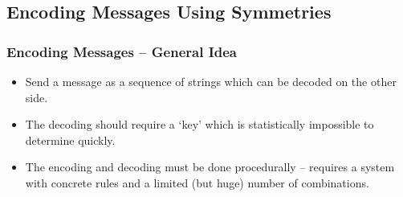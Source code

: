 \documentclass[aspectratio=169,11pt,svgnames,draft]{beamer}
\newcommand{\clc}{\textcolor{PolygonCyan}}
\newcommand{\clb}{\textcolor{PolygonBlue}}
\newcommand{\clo}{\textcolor{PolygonOrange}}
\begin{document}
%  
%

\subsection{Encoding Messages Using Symmetries}
\begin{frame}
 \subsectionpage
\end{frame}

\begin{frame}
 \frametitle{Encoding Messages -- General Idea}
 \begin{itemize}[label=\textbullet]
  \item Send a message as a sequence of strings which \alert{can be decoded on
   the other side}.
  \pause
  \item The decoding should require a `key' which is \alert{statistically
   impossible to determine quickly}.
  \pause
  \item The encoding and decoding must be done procedurally -- requires a system
   with concrete rules and a \alert{limited} (but huge) \alert{number of
   combinations}.
 \end{itemize}
\end{frame}
\end{document}
